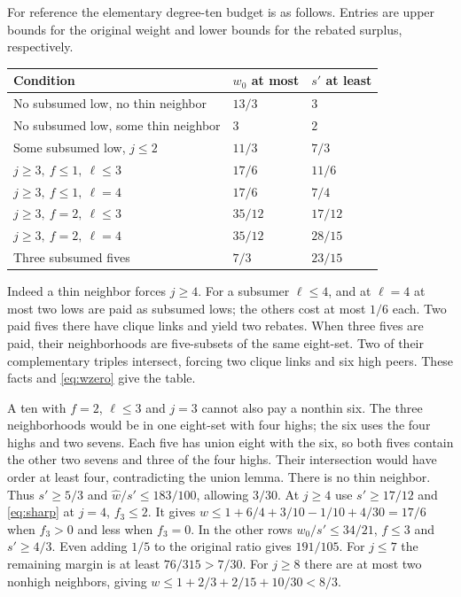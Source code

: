 \documentclass[11pt,a4paper]{amsart}
\newcommand{\wt}{\widehat w}
\begin{document}
For reference the elementary degree-ten budget is as follows.
Entries are upper bounds for the original weight and lower bounds
for the rebated surplus, respectively.
\begin{center}\small
\begin{tabular}{@{}lll@{}}\hline
Condition & $w_0$ at most & $s'$ at least\\ \hline
No subsumed low, no thin neighbor & $13/3$ & $3$\\
No subsumed low, some thin neighbor & $3$ & $2$\\
Some subsumed low, $j\le2$ & $11/3$ & $7/3$\\
$j\ge3,\ f\le1,\ \ell\le3$ & $17/6$ & $11/6$\\
$j\ge3,\ f\le1,\ \ell=4$ & $17/6$ & $7/4$\\
$j\ge3,\ f=2,\ \ell\le3$ & $35/12$ & $17/12$\\
$j\ge3,\ f=2,\ \ell=4$ & $35/12$ & $28/15$\\
Three subsumed fives & $7/3$ & $23/15$\\ \hline
\end{tabular}
\end{center}
Indeed a thin neighbor forces $j\ge4$. For a subsumer
$\ell\le4$, and at $\ell=4$ at most two lows are paid as
subsumed lows; the others cost at most $1/6$ each. Two paid fives
there have clique links and yield two rebates. When three fives
are paid, their neighborhoods are five-subsets of the same
eight-set. Two of their complementary triples intersect, forcing
two clique links and six high peers. These facts and
\eqref{eq:wzero} give the table.

A ten with $f=2$, $\ell\le3$ and $j=3$ cannot also pay a nonthin
six. The three neighborhoods would be in one eight-set with four
highs; the six uses the four highs and two sevens. Each five has
union eight with the six, so both fives contain the other two
sevens and three of the four highs. Their intersection would have
order at least four, contradicting the union lemma. There is no
thin neighbor. Thus $s'\ge5/3$ and $\wt/s'\le183/100$, allowing
$3/30$. At $j\ge4$ use $s'\ge17/12$ and \eqref{eq:sharp} at
$j=4$, $f_3\le2$. It gives
$w\le1+6/4+3/10-1/10+4/30=17/6$ when $f_3>0$ and less
when $f_3=0$. In the other rows $w_0/s'\le34/21$, $f\le3$ and
$s'\ge4/3$. Even adding $1/5$ to the original ratio gives
$191/105$. For $j\le7$ the remaining margin is at least
$76/315>7/30$. For $j\ge8$ there are at most two nonhigh
neighbors, giving $w\le1+2/3+2/15+10/30<8/3$.
\end{document}
